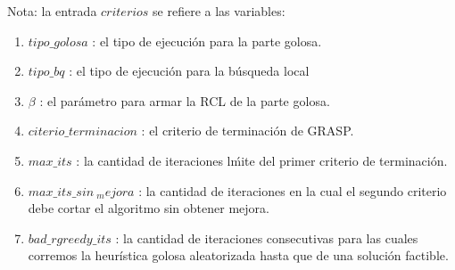 Nota: la entrada $criterios$ se refiere a las variables:

\begin{enumerate}
\item $tipo\_golosa$ : el tipo de ejecuci\'on para la parte golosa.
\item $tipo\_bq$ : el tipo de ejecuci\'on para la b\'usqueda local
\item $\beta$ : el par\'ametro para armar la RCL de la parte golosa.
\item $citerio\_terminacion$ : el criterio de terminaci\'on de GRASP.
\item $max\_its$ : la cantidad de iteraciones l\'mite del primer criterio de terminaci\'on.
\item $max\_its\_sin\ _mejora$ : la cantidad de iteraciones en la cual el segundo criterio debe cortar el algoritmo sin obtener mejora.
\item $bad\_rgreedy\_its$ : la cantidad de iteraciones consecutivas para las cuales corremos la heur\'istica golosa aleatorizada hasta que de una soluci\'on factible.
\end{enumerate}

